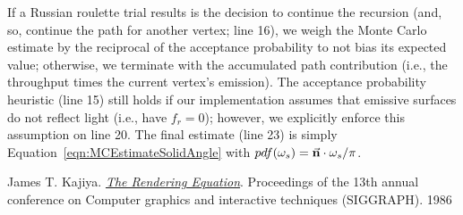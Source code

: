 %
\newline
%
If a Russian roulette trial results is the decision to continue the recursion (and, so, continue the path for another vertex; \textcolor{myred}{line 16}), we weigh the Monte Carlo estimate by the reciprocal of the acceptance probability to not bias its expected value; otherwise, we terminate with the accumulated path contribution (i.e., the throughput times the current vertex's emission). The acceptance probability heuristic (\textcolor{myred}{line 15}) still holds if our implementation assumes that emissive surfaces do not reflect light (i.e., have $f_r = 0$); however, we explicitly enforce this assumption on \textcolor{myred}{line 20}. The final estimate (\textcolor{myred}{line 23}) is simply Equation~\ref{eqn:MCEstimateSolidAngle} with $pdf(\mathbf{\omega}_{s}) = \vec{\mathbf{n}} \cdot \mathbf{\omega}_{s}/\pi$.

\vspace{-10pt}
\renewcommand\refname{\normalsize{Bidirectional Path Tracing Reference}}
\begin{thebibliography}{9}
\vspace{-8pt}
 James T. Kajiya. {\em \href{http://citeseerx.ist.psu.edu/viewdoc/summary?doi=10.1.1.63.1402}{The Rendering Equation}}. Proceedings of the 13th annual conference on Computer graphics and interactive techniques (SIGGRAPH). 1986
\end{thebibliography}
